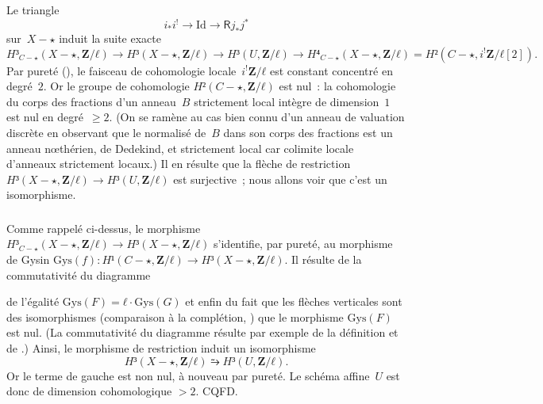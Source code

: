 \documentclass[10pt]{../fichiers-configuration-latex/smfart}
\begin{document}
\subsubsection{}Le triangle
\[
i_* i^! → \mathrm{Id} → 𝖱 j_* j^*
\]
sur $X-⋆$ induit la suite exacte
\[
H³_{C-⋆}(X-⋆,𝐙/ℓ) → H³(X-⋆,𝐙/ℓ) → H³(U,𝐙/ℓ) →
H⁴_{C-⋆}(X-⋆,𝐙/ℓ)=H²(C-⋆,i^! 𝐙/ℓ[2]).
\]
Par pureté (), le faisceau de cohomologie locale $i^! 𝐙/ℓ$ est
constant concentré en degré $2$. Or le groupe de cohomologie $H²(C-⋆,𝐙/ℓ)$ est
nul : la cohomologie du corps des fractions d'un anneau $B$
strictement local intègre de dimension $1$ est nul en
degré $≥2$. (On se ramène au cas bien connu d'un anneau de valuation
discrète en observant que le normalisé
de $B$ dans son corps des fractions est un
anneau nœthérien, de Dedekind, et strictement local
car colimite locale d'anneaux strictement locaux.)
Il en résulte que la flèche de restriction
$H³(X-⋆,𝐙/ℓ) → H³(U,𝐙/ℓ)$ est surjective ; nous allons
voir que c'est un isomorphisme.

\subsubsection{}Comme rappelé ci-dessus, le
morphisme $H³_{C-⋆}(X-⋆,𝐙/ℓ) → H³(X-⋆,𝐙/ℓ)$
s'identifie, par pureté, au morphisme
de Gysin $\mathrm{Gys}(f):H¹(C-⋆,𝐙/ℓ) → H³(X-⋆,𝐙/ℓ)$.
Il résulte de la commutativité du diagramme
\begin{center}
\end{center}
de l'égalité $\mathrm{Gys}(F)=ℓ ⋅ \mathrm{Gys}(G)$
et enfin du fait que les flèches verticales sont
des isomorphismes (comparaison à la complétion,
\cite[6.6.4]{TUBULAR@Fujiwara}) que le morphisme $\mathrm{Gys}(F)$ est nul.
(La commutativité du diagramme résulte par exemple
de la définition 
et de .)
Ainsi, le morphisme de restriction induit un
isomorphisme
\[
H³(X-⋆,𝐙/ℓ) ⥲ H³(U,𝐙/ℓ).
\]
Or le terme de gauche est non nul, à nouveau par pureté.
Le schéma affine $U$ est donc de dimension cohomologique $>2$. CQFD.
\end{document}
